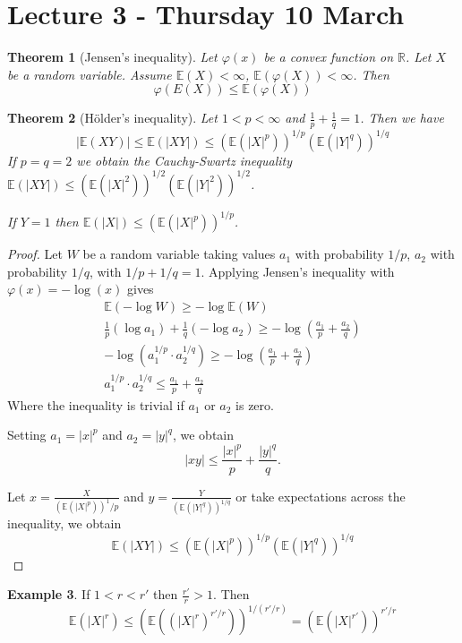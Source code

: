 \documentclass[10pt, oneside, reqno]{amsart}
\theoremstyle{plain}%
\newtheorem{thm}{Theorem}[section]
\theoremstyle{definition}
\newtheorem{exmp}[thm]{Example}
\theoremstyle{remark}
\renewcommand{\phi}{\varphi}
\newcommand{\R}{\mathbb{R}}
\newcommand{\E}{\mathbb{E}}
\begin{document}

\section{Lecture 3 - Thursday 10 March} %
\label{sec:lecture_3_thursday_10_march}
\begin{thm}[Jensen's inequality]
    Let $\phi(x)$ be a convex function on $\R$.  Let $X$ be a random variable.  Assume $\E(X) < \infty$, $\E(\phi(X)) < \infty$.  Then \[
        \phi(E(X)) \leq \E(\phi(X))
    \]
\end{thm}

\begin{thm}[H\"older's inequality]
    Let $1 < p < \infty$ and $\frac{1}{p} + \frac{1}{q} = 1$. Then we have\[
        | \E(XY) | \leq \E(|XY|) \leq \left( \E(|X|^p) \right)^{1/p} \left( \E(|Y|^q) \right)^{1/q}
    \] 
    If $p = q = 2$ we obtain the Cauchy-Swartz inequality $\E(|XY|) \leq \left( \E(|X|^2) \right)^{1/2} \left( \E(|Y|^2) \right)^{1/2}$.
    
    If $Y = 1$ then $\E(|X|) \leq ( \E(|X|^p))^{1/p}$.
\end{thm}
\begin{proof}
    Let $W$ be a random variable taking values $a_1$ with probability $1/p$, $a_2$ with probability $1/q$, with $1/p + 1/q = 1$.  Applying Jensen's inequality with $\phi(x) = -\log(x)$ gives 
    \begin{align*}
        \E( - \log W) \geq -\log \E(W) \\
        \frac{1}{p} (\log a_1) + \frac{1}{q} ( -\log a_2) \geq -\log( \frac{a_1}{p} + \frac{a_2}{q}) \\
        -\log(a_1^{1/p} \cdot a_2^{1/q}) \geq -\log( \frac{a_1}{p} + \frac{a_2}{q})  \\
        a_1^{1/p} \cdot a_2^{1/q} \leq \frac{a_1}{p} + \frac{a_2}{q}
    \end{align*}
    Where the inequality is trivial if $a_1$ or $a_2$ is zero.
    
    Setting $a_1 = |x|^p$ and $a_2 = |y|^q$, we obtain \[
        |xy| \leq \frac{|x|^p}{p} + \frac{|y|^q}{q}.
    \]
    
    Let $x = \frac{X}{(\E(|X|^p))^1/p}$ and $y = \frac{Y}{(\E(|Y|^q))^{1/q}}$
or take expectations across the inequality, we obtain \[
    \E(|XY|) \leq \left( \E(|X|^p) \right)^{1/p} \left( \E(|Y|^q) \right)^{1/q}
\]
\end{proof}


\begin{exmp}
    If $1 < r < r'$ then $\frac{r'}{r} > 1$.  Then \[
        \E(|X|^r) \leq (\E((|X|^r)^{r'/r}))^{1/(r'/r)} = (\E(|X|^{r'}))^{r'/r}
    \]
\end{exmp}
\end{document}
